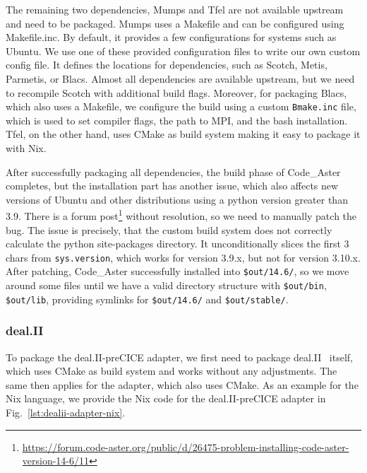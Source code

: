 \documentclass{eceasst}
\begin{document}
The remaining two dependencies, Mumps and Tfel are not available upstream and need to be packaged.
Mumps uses a Makefile and can be configured using Makefile.inc. By default, it provides a few configurations for systems such as Ubuntu. We use one of these provided configuration files to write our own custom config file.
It defines the locations for dependencies, such as Scotch, Metis, Parmetis, or Blacs.
Almost all dependencies are available upstream, but we need to recompile Scotch with additional build flags.
Moreover, for packaging Blacs, which also uses a Makefile, we configure the build using a custom \texttt{Bmake.inc} file, which is used to set compiler flags, the path to MPI, and the bash installation.
Tfel, on the other hand, uses CMake as build system making it easy to package it with Nix.

After successfully packaging all dependencies, the build phase of Code\_Aster completes, but the installation part has another issue, which also affects new versions of Ubuntu and other distributions using a python version greater than 3.9.
There is a forum post\footnote{\url{https://forum.code-aster.org/public/d/26475-problem-installing-code-aster-version-14-6/11}} without resolution, so we need to manually patch the bug.
The issue is precisely, that the custom build system does not correctly calculate the python site-packages directory. It unconditionally slices the first 3 chars from \texttt{sys.version}, which works for version 3.9.x, but not for version 3.10.x.
After patching, Code\_Aster successfully installed into \texttt{\$out/14.6/}, so we move around some files until we have a valid directory structure with \texttt{\$out/bin}, \texttt{\$out/lib}, providing symlinks for \texttt{\$out/14.6/} and \texttt{\$out/stable/}.

\subsubsection{deal.II}


To package the deal.II-preCICE adapter, we first need to package deal.II~\cite{dealII95} itself, which uses CMake as build system and works without any adjustments.
The same then applies for the adapter, which also uses CMake.
As an example for the Nix language, we provide the Nix code for the deal.II-preCICE adapter in Fig.~\ref{lst:dealii-adapter-nix}.
\end{document}
